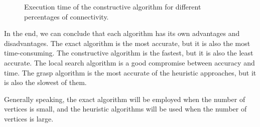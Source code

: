 \begin{figure}[H]
    \centering
    \caption{Execution time of the constructive algorithm for different percentages of connectivity.}
    \label{fig:constructive_time}
\end{figure}

In the end, we can conclude that each algorithm has its own advantages and
disadvantages. The exact algorithm is the most accurate, but it is also the most
time-consuming. The constructive algorithm is the fastest, but it is also the
least accurate. The local search algorithm is a good compromise between accuracy
and time. The grasp algorithm is the most accurate of the heuristic approaches,
but it is also the slowest of them.
\bigskip

Generally speaking, the exact algorithm will be employed when the number of
vertices is small, and the heuristic algorithms will be used when the number of
vertices is large.